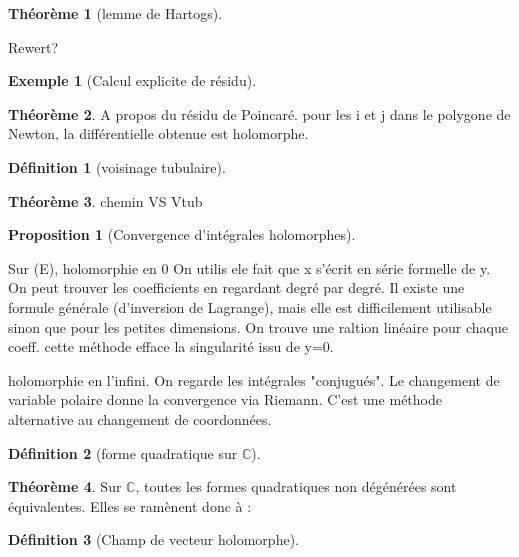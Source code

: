 \documentclass{article}
\newcommand{\C}{\mathbb{C}} %
\theoremstyle{definition} %
\newtheorem{defi}{Définition}
\newtheorem{thm}{Théorème}
\newtheorem{prop}{Proposition}
\newtheorem{ex}{Exemple}
\newcommand{\1}{\mathbb{1}} %
\begin{document}
\begin{thm}[lemme de Hartogs]

\end{thm}

Rewert?

\begin{ex}[Calcul explicite de résidu]

\end{ex}

\begin{thm}
A propos du résidu de Poincaré.
pour les i et j dans le polygone de Newton, la différentielle obtenue est holomorphe.
\end{thm}

\begin{defi}[voisinage tubulaire]

\end{defi}

\begin{thm}
chemin VS Vtub
\end{thm}


\begin{prop}[Convergence d'intégrales holomorphes]

\end{prop}

Sur (E),
holomorphie en 0
On utilis ele fait que x s'écrit en série formelle de y.
On peut trouver les coefficients en regardant degré par degré.
Il existe une formule générale (d'inversion de Lagrange), mais elle est difficilement utilisable sinon que pour les petites dimensions.
On trouve une raltion linéaire pour chaque coeff.
cette méthode efface la singularité issu de y=0.

holomorphie en l'infini.
On regarde les intégrales "conjugués".
Le changement de variable polaire donne la convergence via Riemann.
C'est une méthode alternative au changement de coordonnées.



\begin{defi}[forme quadratique sur $\C$]

\end{defi}

\begin{thm}
Sur $\C$, toutes les formes quadratiques non dégénérées sont équivalentes.
Elles se ramènent donc à :
\end{thm}


\begin{defi}[Champ de vecteur holomorphe]

\end{defi}
\end{document}
